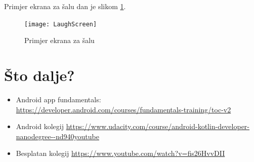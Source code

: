 \documentclass[11pt,a4paper,twoside]{article}
\begin{document}
Primjer ekrana za šalu dan je slikom \ref{fig:LaughScreen}.

\begin{figure}[!h]
	\centering
	\texttt{[image: LaughScreen]}
	\caption{Primjer ekrana za šalu}	
	\label{fig:LaughScreen}
\end{figure}

\section{Što dalje?}

	\begin{itemize}
		\item Android app fundamentals: \url{https://developer.android.com/courses/fundamentals-training/toc-v2}
		\item Android kolegij \url{https://www.udacity.com/course/android-kotlin-developer-nanodegree--nd940youtube }
		\item Besplatan kolegij \url{https://www.youtube.com/watch?v=fis26HvvDII}
	\end{itemize}


	
\end{document}
